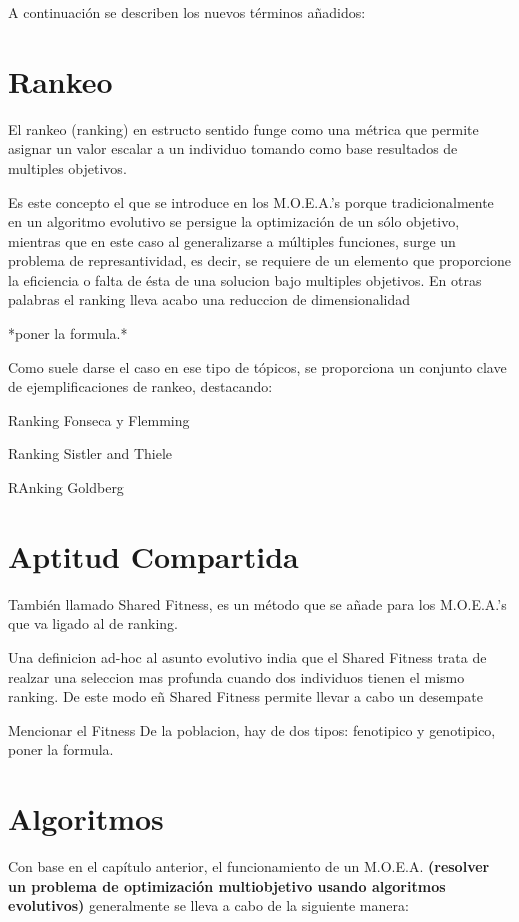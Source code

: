 \documentclass[class=report, crop=false]{standalone}
\begin{document}
A continuación se describen los nuevos términos añadidos:

\section{Rankeo}
El rankeo (ranking) en estructo sentido funge como una métrica 
que permite asignar un valor escalar a un individuo tomando como 
base resultados de multiples objetivos.\break

Es este concepto el que se introduce en los M.O.E.A.'s porque 
tradicionalmente en un algoritmo evolutivo se persigue la 
optimización de un sólo objetivo, mientras que en este caso 
al generalizarse a múltiples funciones, surge un problema de 
represantividad, es decir, se requiere de un elemento que 
proporcione la eficiencia o falta de ésta de una solucion
bajo multiples objetivos. En otras palabras el ranking lleva 
acabo una reduccion de dimensionalidad

*poner la formula.*

Como suele darse el caso en ese tipo de tópicos, se proporciona 
un conjunto clave de ejemplificaciones de rankeo, destacando: 

Ranking Fonseca y Flemming

Ranking Sistler and Thiele

RAnking Goldberg



\section{Aptitud Compartida}  
También llamado Shared Fitness, es un método que se añade para los M.O.E.A.'s que va ligado al de ranking.

Una definicion ad-hoc al asunto evolutivo india que el Shared Fitness trata de realzar una seleccion mas profunda cuando
dos individuos tienen el mismo ranking. De este modo eñ Shared Fitness permite llevar a cabo un desempate

Mencionar el Fitness De la poblacion, hay de dos tipos: fenotipico y genotipico, poner la formula.

\section{Algoritmos}
Con base en el capítulo anterior, el funcionamiento de un M.O.E.A. 
\textbf{(resolver un problema de optimización multiobjetivo usando 
algoritmos evolutivos)} generalmente se lleva a cabo de la siguiente 
manera:
\end{document}
